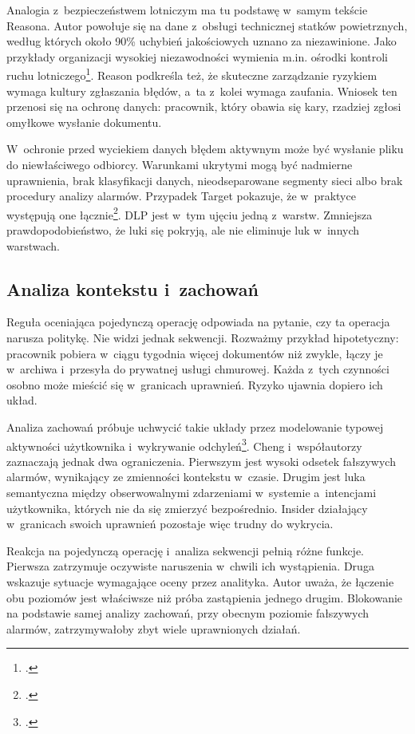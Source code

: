 \documentclass[12pt,a4paper]{article}
\begin{document}
Analogia z~bezpieczeństwem lotniczym ma tu podstawę w~samym tekście Reasona.
Autor powołuje się na dane z~obsługi technicznej statków powietrznych, według
których około 90\% uchybień jakościowych uznano za niezawinione. Jako
przykłady organizacji wysokiej niezawodności wymienia m.in. ośrodki kontroli
ruchu lotniczego\footcite{reason2000human}. Reason podkreśla też, że skuteczne
zarządzanie ryzykiem wymaga kultury zgłaszania błędów, a~ta z~kolei wymaga
zaufania. Wniosek ten przenosi się na ochronę danych: pracownik, który obawia
się kary, rzadziej zgłosi omyłkowe wysłanie dokumentu.

W~ochronie przed wyciekiem danych błędem aktywnym może być wysłanie pliku do
niewłaściwego odbiorcy. Warunkami ukrytymi mogą być nadmierne uprawnienia,
brak klasyfikacji danych, nieodseparowane segmenty sieci albo brak procedury
analizy alarmów. Przypadek Target pokazuje, że w~praktyce występują one
łącznie\footcite{cheng2017enterprise}. DLP jest w~tym ujęciu jedną z~warstw.
Zmniejsza prawdopodobieństwo, że luki się pokryją, ale nie eliminuje luk
w~innych warstwach.

\subsection{Analiza kontekstu i~zachowań}

Reguła oceniająca pojedynczą operację odpowiada na pytanie, czy ta operacja
narusza politykę. Nie widzi jednak sekwencji. Rozważmy przykład hipotetyczny:
pracownik pobiera w~ciągu tygodnia więcej dokumentów niż zwykle, łączy je
w~archiwa i~przesyła do prywatnej usługi chmurowej. Każda z~tych czynności
osobno może mieścić się w~granicach uprawnień. Ryzyko ujawnia dopiero ich
układ.

Analiza zachowań próbuje uchwycić takie układy przez modelowanie typowej
aktywności użytkownika i~wykrywanie odchyleń\footcite{cheng2017enterprise}.
Cheng i~współautorzy zaznaczają jednak dwa ograniczenia. Pierwszym jest
wysoki odsetek fałszywych alarmów, wynikający ze zmienności kontekstu
w~czasie. Drugim jest luka semantyczna między obserwowalnymi zdarzeniami
w~systemie a~intencjami użytkownika, których nie da się zmierzyć
bezpośrednio. Insider działający w~granicach swoich uprawnień pozostaje więc
trudny do wykrycia.

Reakcja na pojedynczą operację i~analiza sekwencji pełnią różne funkcje.
Pierwsza zatrzymuje oczywiste naruszenia w~chwili ich wystąpienia. Druga
wskazuje sytuacje wymagające oceny przez analityka. Autor uważa, że łączenie
obu poziomów jest właściwsze niż próba zastąpienia jednego drugim. Blokowanie
na podstawie samej analizy zachowań, przy obecnym poziomie fałszywych
alarmów, zatrzymywałoby zbyt wiele uprawnionych działań.
\end{document}
